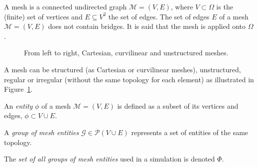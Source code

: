 \begin{mydef}
A mesh is a connected undirected graph $\mathcal{M}=(V,E)$, where $V\subset \Omega$ is the (finite) set of vertices and $E\subseteq V^2$ the set of edges. The set of edges $E$ of a mesh $\mathcal{M}=(V,E)$ does not contain bridges. It is said that the mesh is applied onto $\Omega$.
\end{mydef}
\begin{figure}[!h]\begin{center}
  \caption{From left to right, Cartesian, curvilinear and unstructured meshes.}
  \label{fig:mesh1}
\end{center}\end{figure}
A mesh can be structured (as Cartesian or curvilinear meshes), unstructured, regular or irregular (without the same topology for each element) as illustrated in Figure~\ref{fig:mesh1}. 

\medskip

\begin{mydefs}
\item An \textit{entity} $\phi$ of a mesh $\mathcal{M}=(V,E)$ is defined as a subset of its vertices and edges, $\phi\subset V\cup E$.
\item A \textit{group of mesh entities} $\mathcal{G} \in \mathcal{P}(V\cup E)$ represents a set of entities of the same topology.%
\item The \textit{set of all groups of mesh entities} used in a simulation is denoted $\Phi$.
\end{mydefs}

